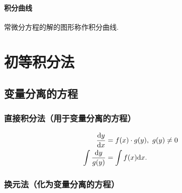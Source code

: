 \documentclass[UTF8]{ctexart}
\begin{document}
\paragraph*{积分曲线}常微分方程的解的图形称作积分曲线.


\section{初等积分法}

\subsection{变量分离的方程}

\subsubsection{直接积分法（用于变量分离的方程）}

$$
\begin{aligned}
\frac{{\rm d}y}{{\rm d}x}&=f(x)\cdot g(y),\ g(y)\neq0\\
\int\frac{{\rm d}y}{g(y)}&=\int f(x){\rm d}x.
\end{aligned}
$$

\subsubsection{换元法（化为变量分离的方程）}
\end{document}
